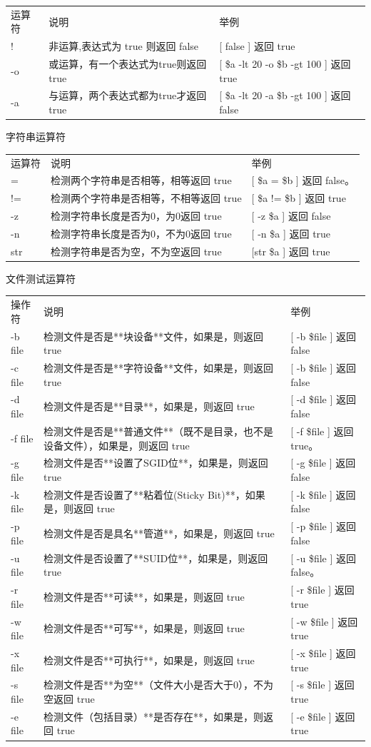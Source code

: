\begin{tabular}{lll}
运算符 & 说明 & 举例 \\
!  & 非运算,表达式为 true 则返回 false &  [ \! false ] 返回 true \\
-o & 或运算，有一个表达式为true则返回true &  [ \$a -lt 20 -o \$b -gt 100 ] 返回 true \\
-a & 与运算，两个表达式都为true才返回true &  [ \$a -lt 20 -a \$b -gt 100 ] 返回 false \\
\end{tabular}

字符串运算符

\begin{tabular}{lll}
运算符 & 说明 & 举例 \\
=   & 检测两个字符串是否相等，相等返回 true &  [ \$a = \$b ] 返回 false。  \\
!=  & 检测两个字符串是否相等，不相等返回 true &  [ \$a != \$b ] 返回 true  \\
-z  & 检测字符串长度是否为0，为0返回 true &   [ -z \$a ] 返回 false   \\
-n &  检测字符串长度是否为0，不为0返回 true &   [ -n \$a ] 返回 true  \\
str &  检测字符串是否为空，不为空返回 true &  [str \$a ] 返回 true   \\
\end{tabular}

文件测试运算符

\begin{tabular}{lll}
操作符 & 说明 & 举例 \\
-b file &  检测文件是否是**块设备**文件，如果是，则返回 true &  [ -b \$file ] 返回 false  \\
-c file & 检测文件是否是**字符设备**文件，如果是，则返回 true &  [ -b \$file ] 返回 false  \\
-d file & 检测文件是否是**目录**，如果是，则返回 true &  [ -d \$file ] 返回 false  \\
-f file & 检测文件是否是**普通文件**（既不是目录，也不是设备文件），如果是，则返回 true &  [ -f \$file ] 返回 true。 \\
-g file & 检测文件是否**设置了SGID位**，如果是，则返回 true &  [ -g \$file ] 返回 false \\
-k file & 检测文件是否设置了**粘着位(Sticky Bit)**，如果是，则返回 true &  [ -k \$file ] 返回 false \\
-p file & 检测文件是否是具名**管道**，如果是，则返回 true &  [ -p \$file ] 返回 false \\
-u file & 检测文件是否设置了**SUID位**，如果是，则返回 true &  [ -u \$file ] 返回 false。\\
-r file & 检测文件是否**可读**，如果是，则返回 true & [ -r \$file ] 返回 true \\
-w file & 检测文件是否**可写**，如果是，则返回 true &  [ -w \$file ] 返回 true \\
-x file & 检测文件是否**可执行**，如果是，则返回 true &  [ -x \$file ] 返回 true \\
-s file & 检测文件是否**为空**（文件大小是否大于0），不为空返回 true &  [ -s \$file ] 返回 true \\
-e file & 检测文件（包括目录）**是否存在**，如果是，则返回 true &  [ -e \$file ] 返回 true
\end{tabular}

